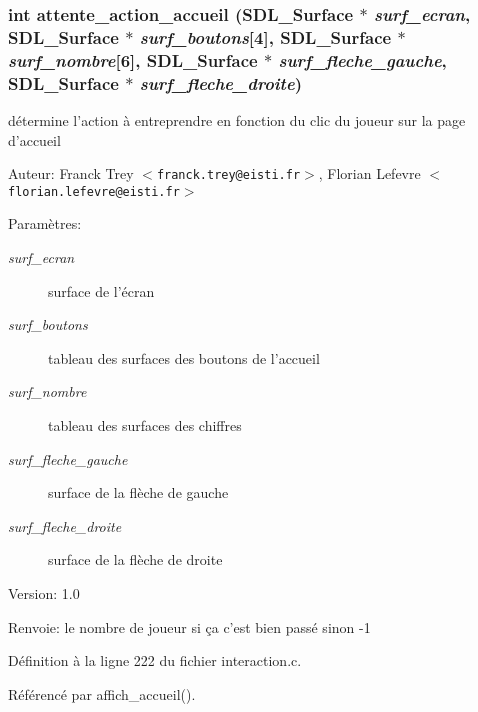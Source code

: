 \subsubsection{\setlength{\rightskip}{0pt plus 5cm}int attente\_\-action\_\-accueil (SDL\_\-Surface $\ast$ {\em surf\_\-ecran}, SDL\_\-Surface $\ast$ {\em surf\_\-boutons}[4], SDL\_\-Surface $\ast$ {\em surf\_\-nombre}[6], SDL\_\-Surface $\ast$ {\em surf\_\-fleche\_\-gauche}, SDL\_\-Surface $\ast$ {\em surf\_\-fleche\_\-droite})}\label{interaction_8h_e4dfe0c2c8be2b77870c32442253dcb8}


d\'{e}termine l'action \`{a} entreprendre en fonction du clic du joueur sur la page d'accueil 

\begin{Desc}
\item[Auteur:]Franck Trey $<${\tt franck.trey@eisti.fr}$>$, Florian Lefevre $<${\tt florian.lefevre@eisti.fr}$>$\end{Desc}
\begin{Desc}
\item[Param\`{e}tres:]
\begin{description}
\item[{\em surf\_\-ecran}]surface de l'\'{e}cran \item[{\em surf\_\-boutons}]tableau des surfaces des boutons de l'accueil \item[{\em surf\_\-nombre}]tableau des surfaces des chiffres \item[{\em surf\_\-fleche\_\-gauche}]surface de la fl\`{e}che de gauche \item[{\em surf\_\-fleche\_\-droite}]surface de la fl\`{e}che de droite\end{description}
\end{Desc}
\begin{Desc}
\item[Version:]1.0 \end{Desc}
\begin{Desc}
\item[Renvoie:]le nombre de joueur si \c{c}a c'est bien pass\'{e} sinon -1 \end{Desc}


D\'{e}finition \`{a} la ligne 222 du fichier interaction.c.

R\'{e}f\'{e}renc\'{e} par affich\_\-accueil().

